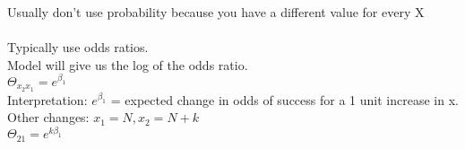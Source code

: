 \documentclass[12 pt]{article}
\begin{document}
\begin{itemize}
\begin{itemize}
            Usually don't use probability because you have a different value for every X\\\\
            Typically use odds ratios. \\
            Model will give us the log of the odds ratio. \\
            $ \Theta_{x_2 x_1} = e^{\beta_1}$\\
            Interpretation: \( e^{\beta_1} \) = expected change in odds of success for a 1 unit increase in x. \\
            Other changes: \( x_1 = N, x_2 = N + k \) \\
            $ \Theta_{21} = e^{k\beta_1}$\\
        \end{itemize}
        
\end{itemize}
\end{document}
